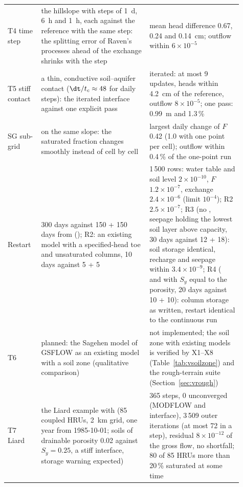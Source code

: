 \begin{longtable}{P{0.13\linewidth}P{0.42\linewidth}P{0.36\linewidth}}
T4 time step & the hillslope with steps of 1~d, 6~h and 1~h, each against the reference with the same step: the splitting error of Raven's processes ahead of the exchange shrinks with the step & mean head difference 0.67, 0.24 and 0.14~cm; outflow within $6\times10^{-5}$\\
T5 stiff contact & a thin, conductive soil--aquifer contact ($\dt/t_c\approx48$ for daily steps): the iterated interface against one explicit pass & iterated: at most 9 updates, heads within 4.2~cm of the reference, outflow $8\times10^{-5}$; one pass: 0.99~m and 1.3\,\%\\
SG sub-grid &  on the same slope: the saturated fraction changes smoothly instead of cell by cell & largest daily change of $F$ 0.42 (1.0 with one point per cell); outflow within 0.4\,\% of the one-point run\\
Restart & 300 days against 150 + 150 days from  (); R2: an existing model with a specified-head toe and unsaturated columns, 10 days against 5 + 5 & 1\,500 rows: water table and soil level $2\times10^{-10}$, $F$ $1.2\times10^{-7}$, exchange $2.4\times10^{-6}$ (limit $10^{-4}$); R2 $2.5\times10^{-7}$; R3 (no , seepage holding the lowest soil layer above capacity, 30 days against 12 + 18): soil storage identical, recharge and seepage within $3.4\times10^{-9}$; R4 ( and  with $S_y$ equal to the porosity, 20 days against 10 + 10): column storage as written, restart identical to the continuous run\\
T6 & planned: the Sagehen model of GSFLOW as an existing model with a soil zone (qualitative comparison) & not implemented; the soil zone with existing models is verified by X1--X8 (Table~\ref{tab:vsoilzone}) and the rough-terrain suite (Section~\ref{sec:vrough})\\
T7 Liard & the Liard example with  (85 coupled HRUs, 2~km grid, one year from 1985-10-01; soils of drainable porosity 0.02 against $S_y=0.25$, a stiff interface, storage warning expected) & 365 steps, 0 unconverged (MODFLOW and interface), 3\,509 outer iterations (at most 72 in a step), residual $8\times10^{-12}$ of the gross flow, no shortfall; 80 of 85 HRUs more than 20\,\% saturated at some time\\\bottomrule
\end{longtable}

